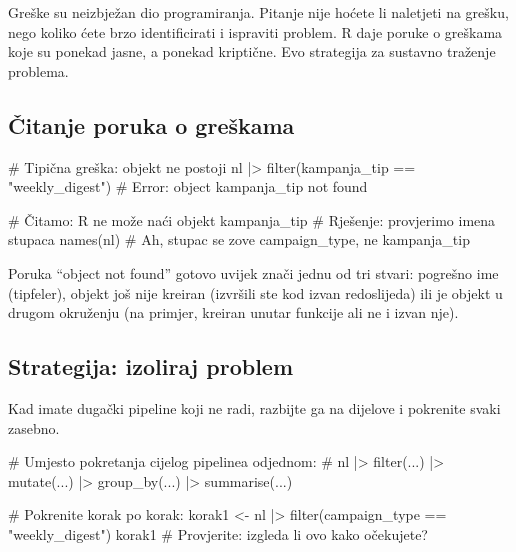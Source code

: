 \documentclass[
  croatian,
  letterpaper,
  DIV=11,
  numbers=noendperiod]{scrartcl}
\newenvironment{Shaded}{\begin{snugshade}}{\end{snugshade}}
\newcommand{\CommentTok}[1]{\textcolor[rgb]{0.37,0.37,0.37}{#1}}
\newcommand{\FunctionTok}[1]{\textcolor[rgb]{0.28,0.35,0.67}{#1}}
\newcommand{\NormalTok}[1]{\textcolor[rgb]{0.00,0.23,0.31}{#1}}
\newcommand{\OtherTok}[1]{\textcolor[rgb]{0.00,0.23,0.31}{#1}}
\newcommand{\SpecialCharTok}[1]{\textcolor[rgb]{0.37,0.37,0.37}{#1}}
\newcommand{\StringTok}[1]{\textcolor[rgb]{0.13,0.47,0.30}{#1}}
\begin{document}
Greške su neizbježan dio programiranja. Pitanje nije hoćete li naletjeti
na grešku, nego koliko ćete brzo identificirati i ispraviti problem. R
daje poruke o greškama koje su ponekad jasne, a ponekad kriptične. Evo
strategija za sustavno traženje problema.

\subsection{Čitanje poruka o
greškama}\label{ux10ditanje-poruka-o-greux161kama}

\begin{Shaded}
\begin{Highlighting}[]
\CommentTok{\# Tipična greška: objekt ne postoji}
\NormalTok{nl }\SpecialCharTok{|\textgreater{}}
  \FunctionTok{filter}\NormalTok{(kampanja\_tip }\SpecialCharTok{==} \StringTok{"weekly\_digest"}\NormalTok{)}
\CommentTok{\# Error: object \textquotesingle{}kampanja\_tip\textquotesingle{} not found}

\CommentTok{\# Čitamo: R ne može naći objekt \textquotesingle{}kampanja\_tip\textquotesingle{}}
\CommentTok{\# Rješenje: provjerimo imena stupaca}
\FunctionTok{names}\NormalTok{(nl)}
\CommentTok{\# Ah, stupac se zove \textquotesingle{}campaign\_type\textquotesingle{}, ne \textquotesingle{}kampanja\_tip\textquotesingle{}}
\end{Highlighting}
\end{Shaded}

Poruka ``object not found'' gotovo uvijek znači jednu od tri stvari:
pogrešno ime (tipfeler), objekt još nije kreiran (izvršili ste kod izvan
redoslijeda) ili je objekt u drugom okruženju (na primjer, kreiran
unutar funkcije ali ne i izvan nje).

\subsection{Strategija: izoliraj
problem}\label{strategija-izoliraj-problem}

Kad imate dugački pipeline koji ne radi, razbijte ga na dijelove i
pokrenite svaki zasebno.

\begin{Shaded}
\begin{Highlighting}[]
\CommentTok{\# Umjesto pokretanja cijelog pipelinea odjednom:}
\CommentTok{\# nl |\textgreater{} filter(...) |\textgreater{} mutate(...) |\textgreater{} group\_by(...) |\textgreater{} summarise(...)}

\CommentTok{\# Pokrenite korak po korak:}
\NormalTok{korak1 }\OtherTok{\textless{}{-}}\NormalTok{ nl }\SpecialCharTok{|\textgreater{}} \FunctionTok{filter}\NormalTok{(campaign\_type }\SpecialCharTok{==} \StringTok{"weekly\_digest"}\NormalTok{)}
\NormalTok{korak1  }\CommentTok{\# Provjerite: izgleda li ovo kako očekujete?}
\end{Highlighting}
\end{Shaded}
\end{document}
